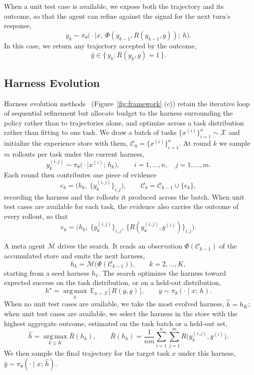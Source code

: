 \documentclass{article}
\begin{document}
When a unit test case is available, we expose both the trajectory and its outcome, so that the agent can refine against the signal for the next turn's response,
\[
  y_k \sim \pi_\theta\big(\cdot \mid x,\ \Phi(y_{k-1}, R(y_{k-1}, g));\ h\big).
\]
In this case, we return any trajectory accepted by the outcome,
\[
\hat{y} \in \{\, y_k : R(y_k, g) = 1 \,\}.
\]

\subsection{Harness Evolution}
\label{sec:method_harness_evolution}
Harness evolution methods~\citep{leeMetaHarnessEndtoEndOptimization2026, lin2026agentic, zhang2026harnessing}  (Figure~\ref{fig:framework} (c)) retain the iterative loop of sequential refinement but allocate budget to the harness surrounding the policy rather than to trajectories alone, and optimize across a task distribution rather than fitting to one task. We draw a batch of tasks $\{x^{(i)}\}_{i=1}^{n} \sim \mathcal{X}$ and initialize the experience store with them, $\mathcal{C}_0 = \{x^{(i)}\}_{i=1}^{n}$. At round $k$ we sample $m$ rollouts per task under the current harness,
\[
  y_k^{(i,j)} \sim \pi_\theta\big(\cdot \mid x^{(i)};\, h_k\big),
  \qquad i = 1, \dots, n, \quad j = 1, \dots, m.
\]
Each round then contributes one piece of evidence
\[
  e_k = \big(h_k,\ \{y_k^{(i,j)}\}_{i,j}\big),
  \qquad
  \mathcal{C}_k = \mathcal{C}_{k-1} \cup \{e_k\},
\]
recording the harness and the rollouts it produced across the batch. When unit test cases are available for each task, the evidence also carries the outcome of every rollout, so that
\[
  e_k = \big(h_k,\ \{y_k^{(i,j)}\}_{i,j},\
  \{R(y_k^{(i,j)}, g^{(i)})\}_{i,j}\big).
\]

A meta agent $\mathcal{M}$ drives the search. It reads an observation $\Phi(\mathcal{C}_{k-1})$ of the accumulated store and emits the next harness,
\[
  h_k = \mathcal{M}\big(\Phi(\mathcal{C}_{k-1})\big),
  \qquad k = 2, \dots, K,
\]
starting from a seed harness $h_1$. The search optimizes the harness toward expected success on the task distribution, or on a held-out distribution,
\[
  h^\star = \operatorname*{arg\,max}_{h}\
  \mathbb{E}_{x \sim \mathcal{X}}\big[\, R(y, g) \,\big],
  \qquad y \sim \pi_\theta(\cdot \mid x;\, h).
\]
When no unit test cases are available, we take the most evolved harness, $\hat{h} = h_K$; when unit test cases are available, we select the harness in the store with the highest aggregate outcome, estimated on the task batch or a held-out set,
\[
  \hat{h} = \operatorname*{arg\,max}_{k \le K} \bar{R}(h_k),
  \qquad
  \bar{R}(h_k) = \frac{1}{nm} \sum_{i=1}^{n} \sum_{j=1}^{m}
  R\big(y_k^{(i,j)}, g^{(i)}\big).
\]
We then sample the final trajectory for the target task $x$ under this harness, $\hat{y} \sim \pi_\theta(\cdot \mid x;\, \hat{h})$.
\end{document}
